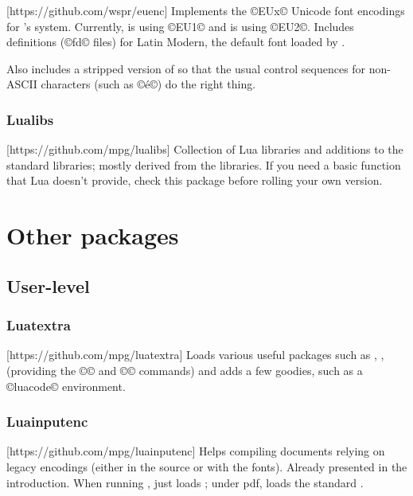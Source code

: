 \documentclass{lltxdoc}
\begin{document}
\medskip
{}[https://github.com/wspr/euenc]
Implements the ©EUx© Unicode font encodings for \latex's  system.
Currently, \xelatex is using ©EU1© and \luatex is using ©EU2©. Includes
definitions (©fd© files) for Latin Modern, the default font loaded by
.

Also includes a stripped version of  so that the usual control
sequences for non-ASCII characters (such as ©\'e©) do the right thing.

\subsubsection{Lualibs}

[https://github.com/mpg/lualibs]
Collection of Lua libraries and additions to the standard libraries; mostly
derived from the \context libraries. If you need a basic function that Lua
doesn't provide, check this package before rolling your own version.

\section{Other packages}

\subsection{User-level}

\subsubsection{Luatextra}

[https://github.com/mpg/luatextra]
Loads various useful packages such as , ,
 (providing the ©\LuaTeX© and ©\LuaLaTeX© commands) and adds a
few goodies, such as a ©luacode© environment.

\subsubsection{Luainputenc}

[https://github.com/mpg/luainputenc]
Helps compiling documents relying on legacy encodings (either in the source or
with the fonts). Already presented in the introduction. When running \xelatex,
just loads ; under pdf\latex, loads the standard
.
\end{document}
